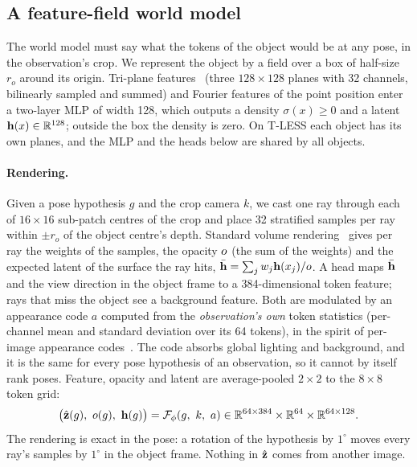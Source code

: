 \subsection{A feature-field world model}
\label{sec:wm}
The world model must say what the tokens of the object would be at any pose, in the observation's crop. We represent the object by a
field over a box of half-size $r_o$ around its origin. Tri-plane features~\cite{chan2022eg3d} (three $128\times128$ planes with 32
channels, bilinearly sampled and summed) and Fourier features of the point position enter a two-layer MLP of width 128, which outputs a
density $\sigma(x)\ge0$ and a latent $\mathbf{h}(x)\in\mathbb{R}^{128}$; outside the box the density is zero. On T-LESS each object has its own
planes, and the MLP and the heads below are shared by all objects.

\paragraph{Rendering.}
Given a pose hypothesis $g$ and the crop camera $k$, we cast one ray through each of $16\times16$ sub-patch centres of the crop and
place 32 stratified samples per ray within $\pm r_o$ of the object centre's depth. Standard volume rendering~\cite{mildenhall2020nerf}
gives per ray the weights of the samples, the opacity $o$ (the sum of the weights) and the expected latent of the surface the ray hits,
$\bar{\mathbf{h}}=\sum_j w_j\mathbf{h}(x_j)/o$. A head maps $\bar{\mathbf{h}}$ and the view direction in the object frame to a 384-dimensional token
feature; rays that miss the object see a background feature. Both are modulated by an appearance code $a$ computed from the
\emph{observation's own} token statistics (per-channel mean and standard deviation over its 64 tokens), in the spirit of per-image
appearance codes~\cite{martinbrualla2021nerfw}. The code absorbs global lighting and background, and it is the same for every pose
hypothesis of an observation, so it cannot by itself rank poses. Feature, opacity and latent are average-pooled $2\times2$ to the
$8\times8$ token grid:
\begin{equation}
\big(\zhat(g),\ \opa(g),\ \hlat(g)\big) = \WM(g,\ k,\ a)\in\mathbb{R}^{64\times384}\times\mathbb{R}^{64}\times\mathbb{R}^{64\times128}.
\label{eq:wm}
\end{equation}
The rendering is exact in the pose: a rotation of the hypothesis by $1^\circ$ moves every ray's samples by $1^\circ$ in the object frame.
Nothing in $\hat{\mathbf{z}}$ comes from another image.

